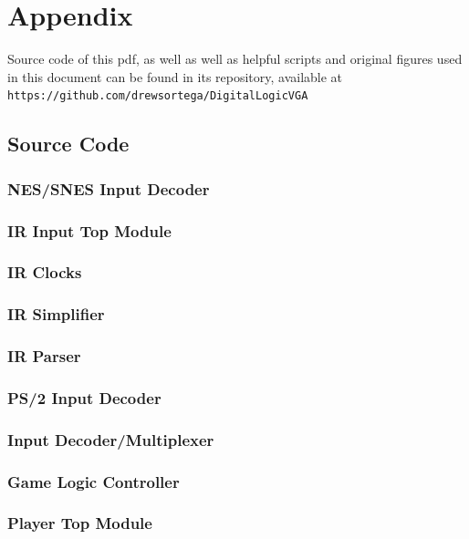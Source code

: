 \documentclass[]{article}
\begin{document}
\section{Appendix}
Source code of this pdf, as well as well as helpful scripts and original figures used in this document can be found in its repository, available at \\\texttt{https://github.com/drewsortega/DigitalLogicVGA}
\subsection{Source Code}
\subsubsection{NES/SNES Input Decoder}

\subsubsection{IR Input Top Module}

\subsubsection{IR Clocks}

\subsubsection{IR Simplifier}

\subsubsection{IR Parser}

\subsubsection{PS/2 Input Decoder}

\subsubsection{Input Decoder/Multiplexer}

\subsubsection{Game Logic Controller}

\subsubsection{Player Top Module}

\end{document}
